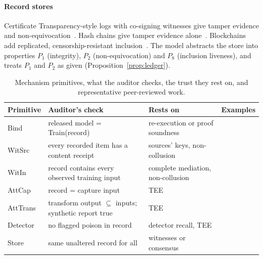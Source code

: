 \paragraph{Record stores}
Certificate Transparency-style logs with co-signing witnesses give tamper evidence and
non-equivocation~\cite{rfc6962}. Hash chains give tamper evidence alone~\cite{li2025auditablellm}.
Blockchains add replicated, censorship-resistant inclusion~\cite{geren2025blockchain,mehammed2025fl}.
The model abstracts the store into properties $P_1$ (integrity), $P_2$ (non-equivocation)
and $P_8$ (inclusion liveness), and treats $P_1$ and $P_2$ as given
(Proposition~\ref{prop:ledger}).

\begin{table}[t]
\centering\scriptsize
\caption{Mechanism primitives, what the auditor checks, the trust they rest on, and
representative peer-reviewed work.}\label{tab:sok}
\begin{tabular}{@{}p{1.2cm}p{2.4cm}p{1.6cm}p{2.1cm}@{}}
\toprule
Primitive & Auditor's check & Rests on & Examples\\
\midrule
Bind & released model = Train(record) & re-execution or proof soundness & \cite{jia2021pol,abbaszadeh2024zkpot,tan2025zkpot,liao2026verilora}\\
WitSrc & every recorded item has a content receipt & sources' keys, non-collusion & \cite{stokes2021prevent,newman2022sigstore,torresarias2019intoto}\\
WitIn & record contains every observed training input & complete mediation, non-collusion & \cite{huang2026exia}\\
AttCap & record = capture input & TEE & \cite{spoczynski2025atlas,duddu2025laminator}\\
AttTrans & transform output $\subseteq$ inputs; synthetic report true & TEE & \cite{spoczynski2025atlas,duddu2025laminator}\\
Detector & no flagged poison in record & detector recall, TEE & \cite{tran2018spectral,hailemariam2025poisonspot,goldblum2023dataset}\\
Store & same unaltered record for all & witnesses or consensus & \cite{rfc6962,li2025auditablellm,mehammed2025fl}\\
\bottomrule
\end{tabular}
\end{table}

